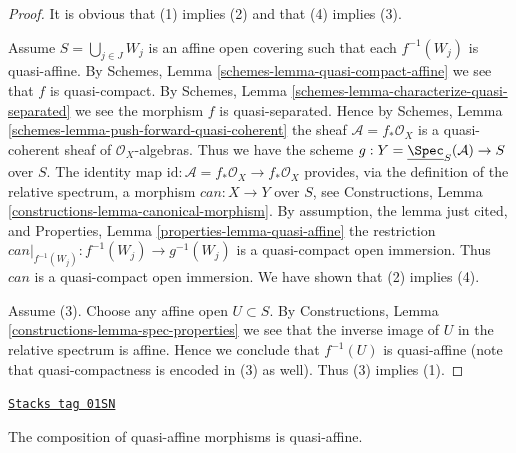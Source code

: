 \begin{proof}
It is obvious that (1) implies (2) and that (4) implies (3).

\medskip\noindent
Assume $S = \bigcup_{j \in J} W_j$ is an affine open covering such that
each $f^{-1}(W_j)$ is quasi-affine. By
Schemes, Lemma \ref{schemes-lemma-quasi-compact-affine} we see
that $f$ is quasi-compact. By
Schemes, Lemma \ref{schemes-lemma-characterize-quasi-separated}
we see the morphism $f$ is quasi-separated. Hence by
Schemes, Lemma \ref{schemes-lemma-push-forward-quasi-coherent} the
sheaf $\mathcal{A} = f_*\mathcal{O}_X$ is a quasi-coherent sheaf
of $\mathcal{O}_X$-algebras. Thus we have the scheme
$g : Y = \underline{\Spec}_S(\mathcal{A}) \to S$ over $S$.
The identity map
$\text{id} : \mathcal{A} = f_*\mathcal{O}_X \to f_*\mathcal{O}_X$
provides, via the definition of the relative spectrum,
a morphism $can : X \to Y$ over $S$, see
Constructions, Lemma \ref{constructions-lemma-canonical-morphism}.
By assumption, the lemma just cited, and
Properties, Lemma \ref{properties-lemma-quasi-affine}
the restriction $can|_{f^{-1}(W_j)} : f^{-1}(W_j) \to g^{-1}(W_j)$
is a quasi-compact open immersion. Thus $can$ is a quasi-compact
open immersion. We have shown that (2) implies (4).

\medskip\noindent
Assume (3). Choose any affine open $U \subset S$.
By Constructions, Lemma \ref{constructions-lemma-spec-properties}
we see that the inverse image of $U$ in the relative spectrum
is affine. Hence we conclude that $f^{-1}(U)$ is quasi-affine
(note that quasi-compactness is encoded in (3) as well).
Thus (3) implies (1).
\end{proof}

\begin{lemma}
\label{morphisms-lemma-composition-quasi-affine}
\href{https://stacks.math.columbia.edu/tag/01SN}{\texttt{Stacks tag 01SN}}

The composition of quasi-affine morphisms is quasi-affine.
\end{lemma}

